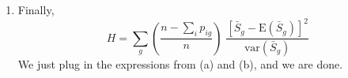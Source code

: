 \documentclass[12pt]{article}
\begin{document}
\begin{enumerate}
\begin{enumerate}
Thus 
\begin{eqnarray*}
\text{var}\{\sum_i R_i p_{ig} / \sum_i p_{ig} \} & = &
\frac{\sum_i p^2_{ig} \text{var}(R_i) + \sum_i \sum_{j: j \ne i} p_{ig}
p_{jg} \text{cov}(R_i, R_j)}{(\sum_i p_{ig})^2} \\
& = & \frac{\frac{(n+1)(n-1)}{12} \sum_i p^2_{ig} - \frac{n+1}{12}
\sum_i \sum_{j: j \ne i} p_{ig} p_{jg}}{(\sum_i p_{ig})^2} \\
& = & \left(\frac{n+1}{12}\right) \left\{ \frac{(n-1)\sum_i p^2_{ig} - \sum_i
\sum_{j: j \ne i} p_{ig} p_{jg}}{(\sum_i p_{ig})^2} \right\} \\
& = & \left(\frac{n+1}{12}\right) \left\{ \frac{n\sum_i p^2_{ig} - (\sum_i
p_{ig})^2}{(\sum_i p_{ig})^2} \right\} 
\end{eqnarray*}

\item Finally, 
$$H  =  \sum_g \left(\frac{n - \sum_i p_{ig}}{n}\right) \;
\frac{[\bar{S}_g - \text{E}(\bar{S}_g)]^2}{\text{var}(\bar{S}_g)} $$
We just plug in the expressions from (a) and (b), and we are done.

\end{enumerate}
 
\end{enumerate}
\end{document}
